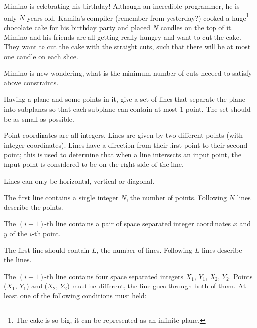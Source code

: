





Mimino is celebrating his birthday!
Although an incredible programmer, he is only $N$ years old.
Kamila's compiler (remember from yesterday?) cooked a huge\footnote{The cake is so big, it can be represented as an infinite plane.}
chocolate cake for his birthday party and placed $N$ candles on the top of it.
Mimino and his friends are all getting really hungry and want to cut the cake.
They want to cut the cake with the straight cuts, such that there will be at most one candle on each slice.

Mimino is now wondering, what is the minimum number of cuts needed to satisfy above constraints.


Having a plane and some points in it, give a set of lines that separate the plane into subplanes so that each subplane can contain at most $1$ point. The set should be as small as possible.

Point coordinates are all integers. Lines are given by two different points (with integer coordinates). Lines have a direction from their first point to their second point; this is used to determine that when a line intersects an input point, the input point is considered to be on the right side of the line.

Lines can only be horizontal, vertical or diagonal.


The first line contains a single integer $N$, the number of points.
Following $N$ lines describe the points.

The $(i+1)$-th line contains a pair of space separated integer coordinates $x$ and $y$ of the $i$-th point.


The first line should contain $L$, the number of lines.
Following $L$ lines describe the lines.

The $(i+1)$-th line contains four space separated integers $X_1$, $Y_1$, $X_2$, $Y_2$. Points ($X_1$, $Y_1$) and ($X_2$, $Y_2$) must be different, the line goes through both of them. At least one of the following conditions must held:

